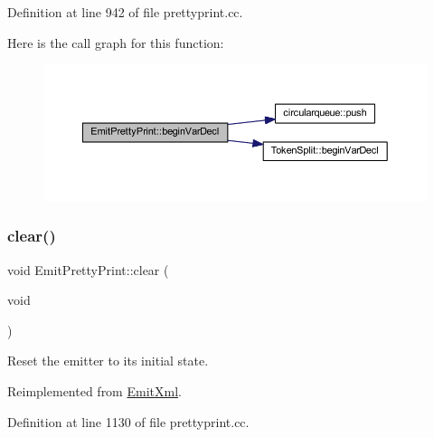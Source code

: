 Definition at line 942 of file prettyprint.\+cc.

Here is the call graph for this function\+:
\nopagebreak
\begin{figure}[H]
\begin{center}
\leavevmode
\includegraphics[width=350pt]{class_emit_pretty_print_a9df518db8bdc76a0327a05cc26701459_cgraph}
\end{center}
\end{figure}
\mbox{\label{class_emit_pretty_print_aaffabdb012376ddeacebbb0463b7ad79}} 
\subsubsection{\texorpdfstring{clear()}{clear()}}
{\footnotesize\ttfamily void Emit\+Pretty\+Print\+::clear (\begin{DoxyParamCaption}\item[{void}]{ }\end{DoxyParamCaption})\hspace{0.3cm}{\ttfamily [virtual]}}



Reset the emitter to its initial state. 



Reimplemented from \mbox{\hyperlink{class_emit_xml_a9f19ca4c4bb59ec6b77a58c0d2f783d7}{Emit\+Xml}}.



Definition at line 1130 of file prettyprint.\+cc.

